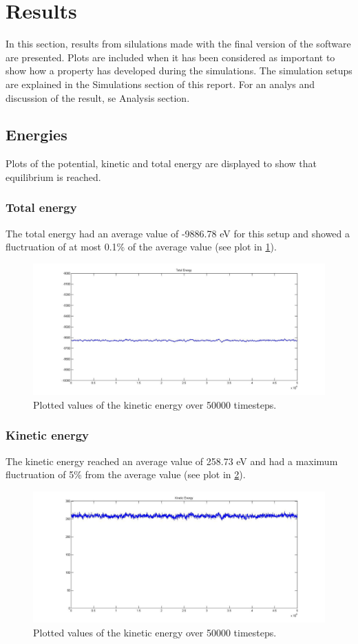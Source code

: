 \section{Results}
In this section, results from silulations made with the final version of the software are presented. Plots are included when it has been considered as important to show how a property has developed during the simulations. The simulation setups are explained in the Simulations section of this report. For an analys and discussion of the result, se Analysis section.
\subsection{Energies}
Plots of the potential, kinetic and total energy are displayed to show that equilibrium is reached. 
\subsubsection{Total energy}
The total energy had an average value of -9886.78 eV for this setup and showed a fluctruation of at most 0.1\% of the average value (see plot in \ref{totale}).
\begin{figure}[h]
	\centering
	\includegraphics[width=1\textwidth]{images/total1.jpg}
	\caption{Plotted values of the kinetic energy over 50000 timesteps.}
	\label{totale}
\end{figure}

\subsubsection{Kinetic energy}
The kinetic energy reached an average value of 258.73 eV and had a maximum fluctruation of 5\% from the average value (see plot in \ref{kinetic}).
\begin{figure}[h]
	\centering
	\includegraphics[width=1\textwidth]{images/kinetic.jpg}
	\caption{Plotted values of the kinetic energy over 50000 timesteps.}
	\label{kinetic}
\end{figure}

